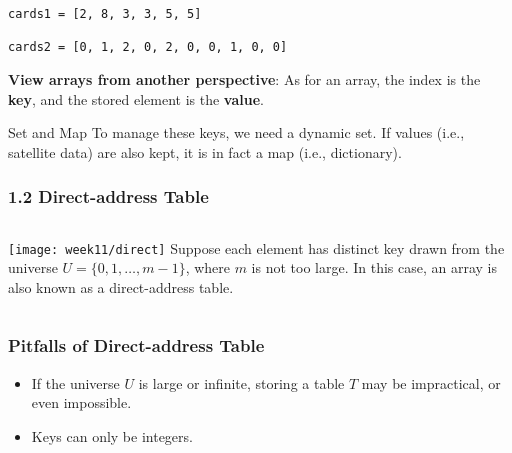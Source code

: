 \documentclass[aspectratio=169, 14pt]{beamer}
\begin{document}
\begin{frame}[fragile]

	\begin{verbatim}
cards1 = [2, 8, 3, 3, 5, 5]

cards2 = [0, 1, 2, 0, 2, 0, 0, 1, 0, 0]
    \end{verbatim}

	\textbf{ View arrays from another perspective}: As for an array, the \alert{index} is the \textbf{key}, and the stored element is the \textbf{value}.

	\begin{exampleblock}{Set and Map}
		To manage these keys, we need a dynamic \alert{set}. If values (i.e., satellite data) are also kept, it is in fact a \alert{map} (i.e., dictionary).
	\end{exampleblock}

\end{frame}



\begin{frame}[fragile]
	\frametitle{1.2 Direct-address Table}

	\begin{columns}

		\texttt{[image: week11/direct]}
		Suppose each element has distinct key drawn from the universe $U = \{0, 1, \dots, m - 1\}$, where $m$ is not too large. In this case, an array is also known as a \alert{direct-address table}.
	\end{columns}

\end{frame}

\begin{frame}
	\frametitle{Pitfalls of Direct-address Table}

	\begin{itemize}
		\item If the universe $U$ is large or infinite, storing a table $T$ may be impractical, or even impossible.
		\item Keys can only be integers.
	\end{itemize}
\end{frame}
\end{document}
